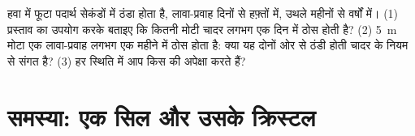 \begin{exercise}[$\star\star\star$]\label{exo:g11:igneous-rocks:15}
हवा में फूटा पदार्थ सेकंडों में ठंडा होता है, लावा-प्रवाह दिनों से हफ़्तों में,
उथले  महीनों से वर्षों में। (1) प्रस्ताव का उपयोग करके बताइए कि कितनी
मोटी चादर लगभग एक दिन में ठोस होती है? (2) \qty{5}{m}
मोटा एक लावा-प्रवाह लगभग एक महीने में ठोस होता है: क्या यह दोनों ओर से ठंडी होती चादर
के नियम से संगत है? (3) हर स्थिति में आप किस  की अपेक्षा करते हैं?
\end{exercise}

\section{समस्या: एक सिल और उसके क्रिस्टल}

